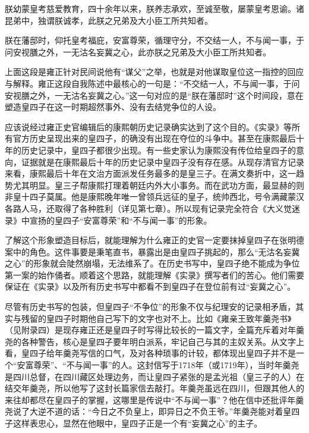 
\begin{bookquote}朕幼蒙皇考慈爱教育，四十余年以来，朕养志承欢，至诚至敬，屡蒙皇考恩谕。诸昆弟中，独谓朕诚孝，此朕之兄弟及大小臣工所共知者。\end{bookquote}


\begin{bookquote}朕在藩邸时，仰托皇考福庇，安富尊荣，循理守分，不交结一人，不与闻一事，于问安视膳之外，一无沽名妄冀之心，此亦朕之兄弟及大小臣工所共知者。\end{bookquote}


上面这段是雍正针对民间说他有“谋父”之举，也就是对他谋取皇位这一指控的回应与解释。雍正这段自我陈述中最核心的一句是：“不交结一人，不与闻一事，于问安视膳之外，一无沽名妄冀之心。”这一句对应的是“朕在藩邸时”这个时间段，意在塑造皇四子在这一时期超然事外、没有去结党争位的人设。



应该说经过雍正史官编辑后的康熙朝历史记录确实达到了这个目的。《实录》等所有官方历史呈现出来的皇四子，的确没有出现在夺位的斗争中。甚至在康熙最后十年的历史记录中，皇四子都很少出现。有一些史家认为康熙没有传位给皇四子的意向，证据就是在康熙最后十年的历史记录中皇四子没有存在感。从现存清官方记录来看，康熙最后十年在文治方面派发任务最多的是皇三子。在满文奏折中，这一趋势尤其明显。皇三子帮康熙打理着朝廷内外大小事务。而在武功方面，最显赫的则非皇十四子莫属。他是康熙晚年唯一曾领兵远征的皇子，统帅西北，号令满藏蒙汉各路人马，还取得了各种胜利（详见第七章）。所以现有记录完全符合《大义觉迷录》中宣扬的皇四子“安富尊荣”和“不与闻一事”的形象。



了解这个形象塑造目标后，就能理解为什么雍正的史官一定要抹掉皇四子在张明德案中的角色。这件事要是秉笔直书，暴露出是由皇四子挑起的，那么“无沽名妄冀之心”的形象就会陡然崩塌，无法维系了。在历史书写中，皇四子绝不能成为争位第一案的始作俑者。顺着这个思路，就能理解《实录》撰写者们的苦心。他们需要保证在《实录》以及所有历史书写中都看不到皇四子在登位前有过“妄冀之心”。



尽管有历史书写的包装，但皇四子“不争位”的形象不仅与纪理安的记录相矛盾，其实与残留的皇四子时期他自己写下的文字也对不上。比如《雍亲王致年羹尧书》（见附录四）是现存雍正还是皇四子时写得比较长的一篇文字，全篇充斥着对年羹尧的各种警告，核心是皇四子要年明白派系，牢记自己与其的主奴关系。从文字上看，皇四子给年羹尧写信的口气，及对各种琐事的计较，都体现出皇四子并不是一个“安富尊荣”、“不与闻一事”的人。这封信写于1718年（或1719年），当时年羹尧是四川总督，在四川藏区处理边务，而让皇四子紧张的是孟光祖（皇三子的人）在结交年羹尧，所以他写了这封长篇家信去敲打。年羹尧虽远在四川，但跟其他人的来往却都尽在皇四子的掌握，这哪里是传说中“不与闻一事”？他在信中还批评年羹尧说了大逆不道的话：“今日之不负皇上，即异日之不负王爷。”年羹尧能对着皇四子这样表忠心，显然在他眼中，皇四子正是一个有“妄冀之心”的主子。



